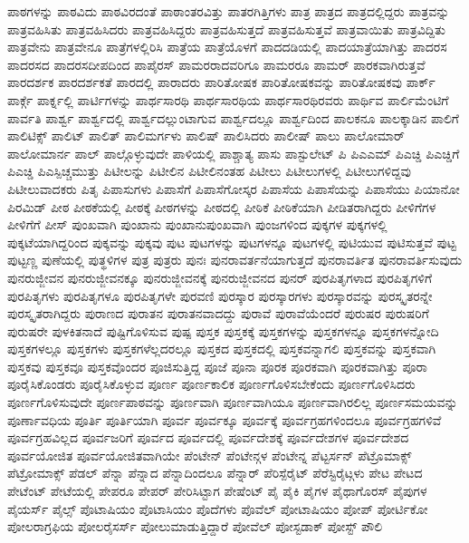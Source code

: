 {ಪಾಠಗಳನ್ನು
ಪಾಠವಿದು
ಪಾಠವಿರದಂತೆ
ಪಾಠಾಂತರವಿತ್ತು
ಪಾತರಗಿತ್ತಿಗಳು
ಪಾತ್ರ
ಪಾತ್ರದ
ಪಾತ್ರದಲ್ಲಿದ್ದರು
ಪಾತ್ರವನ್ನು
ಪಾತ್ರವಹಿಸಿತು
ಪಾತ್ರವಹಿಸಿದರು
ಪಾತ್ರವಹಿಸಿದ್ದರು
ಪಾತ್ರವಹಿಸುತ್ತದೆ
ಪಾತ್ರವಹಿಸುತ್ತವೆ
ಪಾತ್ರವಾಯಿತು
ಪಾತ್ರವಿದ್ದಿತು
ಪಾತ್ರವೇನು
ಪಾತ್ರವೇನೂ
ಪಾತ್ರೆಗಳಲ್ಲಿರಿಸಿ
ಪಾತ್ರೆಯ
ಪಾತ್ರೆಯೊಳಗೆ
ಪಾದದಡಿಯಲ್ಲಿ
ಪಾದಯಾತ್ರೆಯಾಗಿತ್ತು
ಪಾದರಸ
ಪಾದರಸದ
ಪಾದರಸದೀಪದಿಂದ
ಪಾಪೈರಸ್
ಪಾಮರರಾದವರಿಗೂ
ಪಾಮರರೂ
ಪಾಮರ್
ಪಾರಕವಾಗಿರುತ್ತವೆ
ಪಾರದರ್ಶಕ
ಪಾರದರ್ಶಕತೆ
ಪಾರದಲ್ಲಿ
ಪಾರಾದರು
ಪಾರಿತೋಷಕ
ಪಾರಿತೋಷಕವನ್ನು
ಪಾರಿತೋಷಕವು
ಪಾರ್ಕ್
ಪಾರ್ಕ್ಗೆ
ಪಾರ್ಕ್ನಲ್ಲಿ
ಪಾರ್ಟಿಗಳನ್ನು
ಪಾರ್ಥಸಾರಥಿ
ಪಾರ್ಥಸಾರಥಿಯ
ಪಾರ್ಥಸಾರಥಿರವರು
ಪಾರ್ಥಿವ
ಪಾರ್ಲಿಮೆಂಟಿಗೆ
ಪಾರ್ವತಿ
ಪಾರ್ಶ್ವ
ಪಾರ್ಶ್ವದಲ್ಲಿ
ಪಾರ್ಶ್ವದಲ್ಲುಂಟಾಗುವ
ಪಾರ್ಶ್ವದಲ್ಲೂ
ಪಾರ್ಶ್ವದಿಂದ
ಪಾಲಕನೂ
ಪಾಲಕ್ಕಾಡಿನ
ಪಾಲಿಗೆ
ಪಾಲಿಟಿಕ್ಸ್
ಪಾಲಿಟ್
ಪಾಲಿತ್
ಪಾಲಿಮರ್ಗಳು
ಪಾಲಿಷ್
ಪಾಲಿಸಿದರು
ಪಾಲೀಷ್
ಪಾಲು
ಪಾಲೋಮಾರ್
ಪಾಲೋಮಾರ್ನ
ಪಾಲ್
ಪಾಲ್ಗೊಳ್ಳುವುದೇ
ಪಾಳಿಯಲ್ಲಿ
ಪಾಶ್ಚಾತ್ಯ
ಪಾಸು
ಪಾಸ್ಟುಲೇಟ್
ಪಿ
ಪಿಎಎಮ್
ಪಿಎಚ್ಡಿ
ಪಿಎಚ್ಡಿಗೆ
ಪಿಎಚ್ಡಿ
ಪಿಎಸ್ಪಿಚ್ಚಮುತ್ತು
ಪಿಟೀಲನ್ನು
ಪಿಟೀಲಿನ
ಪಿಟೀಲಿನಂತಹ
ಪಿಟೀಲು
ಪಿಟೀಲುಗಳಲ್ಲಿ
ಪಿಟೀಲುಗಳಿದ್ದವು
ಪಿಟೀಲುವಾದಕರು
ಪಿತೃ
ಪಿಪಾಸುಗಳು
ಪಿಪಾಸೆಗೆ
ಪಿಪಾಸೆಗೋಸ್ಕರ
ಪಿಪಾಸೆಯ
ಪಿಪಾಸೆಯನ್ನು
ಪಿಪಾಸೆಯು
ಪಿಯಾನೋ
ಪಿರಮಿಡ್
ಪೀಠ
ಪೀಠಕೆಯಲ್ಲಿ
ಪೀಠಕ್ಕೆ
ಪೀಠಗಳನ್ನು
ಪೀಠದಲ್ಲಿ
ಪೀಠಿಕೆ
ಪೀಠಿಕೆಯಾಗಿ
ಪೀಡಿತರಾಗಿದ್ದರು
ಪೀಳಿಗೆಗಳ
ಪೀಳಿಗೆಗೆ
ಪೀಸ್
ಪುಂಖವಾಗಿ
ಪುಂಖಾನು
ಪುಂಖಾನುಪುಂಖವಾಗಿ
ಪುಂಜಗಳಿಂದ
ಪುಕ್ಕಗಳ
ಪುಕ್ಕಗಳಲ್ಲಿ
ಪುಕ್ಕಟೆಯಾಗಿದ್ದರಿಂದ
ಪುಕ್ಕವನ್ನು
ಪುಕ್ಕವು
ಪುಟ
ಪುಟಗಳನ್ನು
ಪುಟಗಳನ್ನೂ
ಪುಟಗಳಲ್ಲಿ
ಪುಟಿಯುವ
ಪುಟಿಸುತ್ತವೆ
ಪುಟ್ಟ
ಪುಟ್ಟಣ್ಣ
ಪುಣೆಯಲ್ಲಿ
ಪುತ್ಥಳಿಗಳ
ಪುತ್ರ
ಪುತ್ರರು
ಪುನಃ
ಪುನರಾವರ್ತನೆಯಾಗುತ್ತದೆ
ಪುನರಾವರ್ತಿತ
ಪುನರಾವರ್ತಿಸುವುದು
ಪುನರುಜ್ಜೀವನ
ಪುನರುಜ್ಜೀವನಕ್ಕೂ
ಪುನರುಜ್ಜೀವನಕ್ಕೆ
ಪುನರುಜ್ಜೀವನದ
ಪುನರ್
ಪುರಪಿತೃಗಳಾದ
ಪುರಪಿತೃಗಳಿಗೆ
ಪುರಪಿತೃಗಳು
ಪುರಪಿತೃಗಳೂ
ಪುರಪಿತೃಗಳೇ
ಪುರವಣಿ
ಪುರಸ್ಕಾರ
ಪುರಸ್ಕಾರಗಳು
ಪುರಸ್ಕಾರವನ್ನು
ಪುರಸ್ಕೃತರನ್ನೇ
ಪುರಸ್ಕೃತರಾಗಿದ್ದರು
ಪುರಾಣದ
ಪುರಾತನ
ಪುರಾತನವಾದದ್ದು
ಪುರಾವೆ
ಪುರಾವೆಯೆಂದರೆ
ಪುರುಷರ
ಪುರುಷರಿಗೆ
ಪುರುಷರೇ
ಪುಳಕಿತನಾದೆ
ಪುಷ್ಟಿಗೊಳಿಸುವ
ಪುಷ್ಪ
ಪುಸ್ತಕ
ಪುಸ್ತಕಕ್ಕೆ
ಪುಸ್ತಕಗಳನ್ನು
ಪುಸ್ತಕಗಳನ್ನೂ
ಪುಸ್ತಕಗಳನ್ನೋದಿ
ಪುಸ್ತಕಗಳಲ್ಲೂ
ಪುಸ್ತಕಗಳು
ಪುಸ್ತಕಗಳೆಲ್ಲದರಲ್ಲೂ
ಪುಸ್ತಕದ
ಪುಸ್ತಕದಲ್ಲಿ
ಪುಸ್ತಕವನ್ನಾಗಲಿ
ಪುಸ್ತಕವನ್ನು
ಪುಸ್ತಕವಾಗಿ
ಪುಸ್ತಕವು
ಪುಸ್ತಕವೂ
ಪುಸ್ತಕವೊಂದರ
ಪೂಜಿಸುತ್ತಿದ್ದ
ಪೂಜೆ
ಪೂನಾ
ಪೂರಕ
ಪೂರಕವಾಗಿ
ಪೂರಕವಾಗಿತ್ತು
ಪೂರಾ
ಪೂರೈಸಿಕೊಂಡರು
ಪೂರೈಸಿಕೊಳ್ಳುವ
ಪೂರ್ಣ
ಪೂರ್ಣಕಾಲಿಕ
ಪೂರ್ಣಗೊಳಿಸಬೇಕೆಂದು
ಪೂರ್ಣಗೊಳಿಸಿದರು
ಪೂರ್ಣಗೊಳಿಸುವುದೇ
ಪೂರ್ಣಪಾಠವನ್ನು
ಪೂರ್ಣವಾಗಿ
ಪೂರ್ಣವಾಗಿಯೂ
ಪೂರ್ಣವಾಗಿರಲಿಲ್ಲ
ಪೂರ್ಣಸಮಯವನ್ನು
ಪೂರ್ಣಾವಧಿಯ
ಪೂರ್ತಿ
ಪೂರ್ತಿಯಾಗಿ
ಪೂರ್ವ
ಪೂರ್ವಕ್ಕೂ
ಪೂರ್ವಕ್ಕೆ
ಪೂರ್ವಗ್ರಹಗಳಿಂದಲೂ
ಪೂರ್ವಗ್ರಹಗಳಿವೆ
ಪೂರ್ವಗ್ರಹವಿಲ್ಲದ
ಪೂರ್ವಜರಿಗೆ
ಪೂರ್ವದ
ಪೂರ್ವದಲ್ಲಿ
ಪೂರ್ವದೇಶಕ್ಕೆ
ಪೂರ್ವದೇಶಗಳ
ಪೂರ್ವದೇಶದ
ಪೂರ್ವಯೋಜಿತ
ಪೂರ್ವಯೋಜಿತವಾಗಿಯೇ
ಪೆಂಟೇನ್
ಪೆಂಟೇನ್ಗಳ
ಪೆಂಟೇನ್ನ
ಪೆಟ್ಟರ್ಸನ್
ಪೆಟ್ರೊಮಾಕ್ಸ್
ಪೆಟ್ರೋಮಾಕ್ಸ್
ಪೆಡಲ್
ಪೆನ್ನಾ
ಪೆನ್ನಾದ
ಪೆನ್ನಾದಿಂದಲೂ
ಪೆನ್ನಾರ್
ಪೆರಿಸ್ಪೆರೈಟ್
ಪೆರೆಸ್ಟಿರೈಟ್ಗಳು
ಪೇಟ
ಪೇಟದ
ಪೇಟೆಂಟ್
ಪೇಟೆಯಲ್ಲಿ
ಪೇಪರೂ
ಪೇಪರ್
ಪೇರಿಸಿಟ್ಟಾಗ
ಪೇಷೆಂಟ್
ಪೈ
ಪೈಕಿ
ಪೈಗಳ
ಪೈಥಾಗೊರಸ್
ಪೈಪುಗಳ
ಪೈಯರ್ಸ್
ಪೈಲ್ಸ್
ಪೊಟಾಷಿಯಂ
ಪೊಟಾಸಿಯಂ
ಪೊದೆಗಳು
ಪೊವೆಲ್
ಪೋಟಾಷಿಯಂ
ಪೋಪ್
ಪೋರ್ಟಿಕೋ
ಪೋಲರಾಗ್ರಫಿಯ
ಪೋಲರೈಸರ್ಸ್
ಪೋಲುಮಾಡುತ್ತಿದ್ದಾರೆ
ಪೋವೆಲ್
ಪೋಸ್ಟಡಾಕ್
ಪೋಸ್ಟ್
ಪೌಲಿ
}
